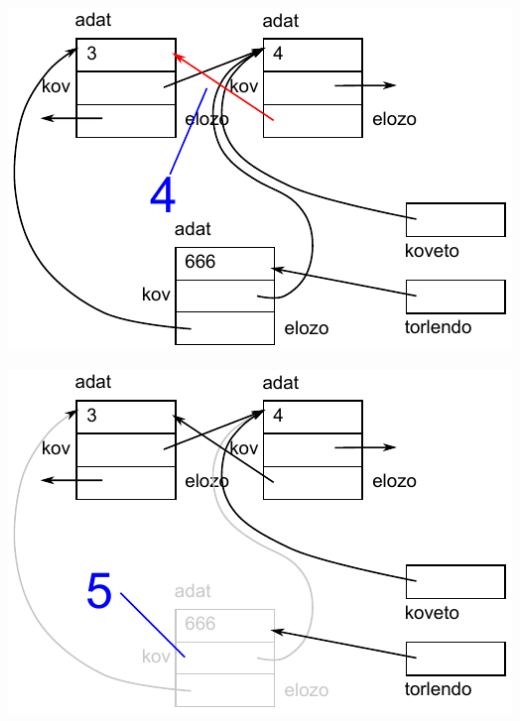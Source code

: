 \begin{frame}
  \begin{center}
    \includegraphics[scale=0.55]{lista2/list2-13.pdf}
  \end{center}
  \vspace{-.4cm}
  \scriptsize
  \begin{exampleblock}{}
    \tiny
    \vspace{-.2cm}
    
    \vspace{-.2cm}
  \end{exampleblock}
\end{frame}

\begin{frame}
  \begin{center}
    \includegraphics[scale=0.55]{lista2/list2-14.pdf}
  \end{center}
  \vspace{-.4cm}
  \scriptsize
  \begin{exampleblock}{}
    \tiny
    \vspace{-.2cm}
    
    \vspace{-.2cm}
  \end{exampleblock}
\end{frame}

